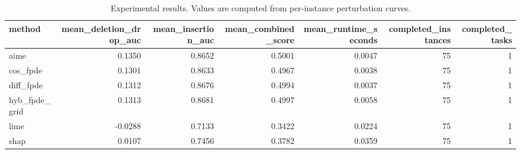 \begin{table}[t]
\caption{Experimental results. Values are computed from per-instance perturbation curves.}
\label{tab:main_results_computed}
\centering
\begin{tabular}{lrrrrrr}
\toprule
method & mean\_deletion\_drop\_auc & mean\_insertion\_auc & mean\_combined\_score & mean\_runtime\_seconds & completed\_instances & completed\_tasks \\
\midrule
aime & 0.1350 & 0.8652 & 0.5001 & 0.0047 & 75 & 1 \\
cos\_fpde & 0.1301 & 0.8633 & 0.4967 & 0.0038 & 75 & 1 \\
diff\_fpde & 0.1312 & 0.8676 & 0.4994 & 0.0037 & 75 & 1 \\
hyb\_fpde\_grid & 0.1313 & 0.8681 & 0.4997 & 0.0058 & 75 & 1 \\
lime & -0.0288 & 0.7133 & 0.3422 & 0.0224 & 75 & 1 \\
shap & 0.0107 & 0.7456 & 0.3782 & 0.0359 & 75 & 1 \\
\bottomrule
\end{tabular}

\end{table}
